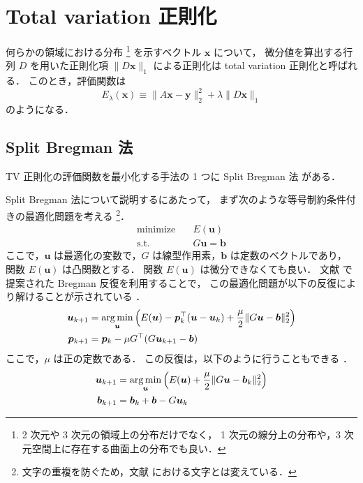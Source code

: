 %

\section{Total variation 正則化}

何らかの領域における分布
\footnote{2 次元や 3 次元の領域上の分布だけでなく，%
    1 次元の線分上の分布や，3 次元空間上に存在する曲面上の分布でも良い．}
を示すベクトル $\bm{x}$ について，
微分値を算出する行列 $D$ を用いた正則化項 $\|D \bm{x}\|_1$ による正則化は
total variation 正則化と呼ばれる．
このとき，評価関数は
\begin{equation}
    E_{\lambda}(\bm{x}) \equiv \|A \bm{x} - \bm{y}\|_2^2 + \lambda \|D \bm{x}\|_1
\end{equation}
のようになる．

\subsection{Split Bregman 法}

TV 正則化の評価関数を最小化する手法の 1 つに
Split Bregman 法 \cite{Goldstein2009}
がある．

Split Bregman 法について説明するにあたって，
まず次のような等号制約条件付きの最適化問題を考える
\cite{Goldstein2009}
\footnote{文字の重複を防ぐため，文献 \cite{Goldstein2009} における文字とは変えている．}．
\begin{align}
    \text{minimize} \hspace{1em} & E(\bm{u})         \\
    \text{s.t.} \hspace{1em}     & G \bm{u} = \bm{b}
\end{align}
ここで，$\bm{u}$ は最適化の変数で，$G$ は線型作用素，$\bm{b}$ は定数のベクトルであり，
関数 $E(\bm{u})$ は凸関数とする．
関数 $E(\bm{u})$ は微分できなくても良い．
文献 \cite{Bregman1967} で提案された Bregman 反復を利用することで，
この最適化問題が以下の反復により解けることが示されている
\cite{Goldstein2009}．
\begin{align}
    \bm{u}_{k+1} & = \operatorname*{arg \thinspace min}_{\bm{u}} \left( E(\bm{u}) - \bm{p}_k^\top (\bm{u} - \bm{u}_k)
    + \frac{\mu}{2} \|G \bm{u} - \bm{b}\|_2^2 \right)
    \\
    \bm{p}_{k+1} & = \bm{p}_k - \mu G^\top (G \bm{u}_{k+1} - \bm{b})
\end{align}
ここで，$\mu$ は正の定数である．
この反復は，以下のように行うこともできる
\cite{Goldstein2009}．
\begin{align}
    \bm{u}_{k+1} & = \operatorname*{arg \thinspace min}_{\bm{u}} \left( E(\bm{u}) + \frac{\mu}{2} \|G \bm{u} - \bm{b}_k\|_2^2 \right)
    \\
    \bm{b}_{k+1} & = \bm{b}_k + \bm{b} - G \bm{u}_k
\end{align}

